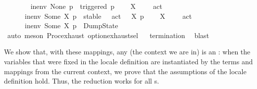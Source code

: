 \begin{isabellebody}
\ \ \ \isanewline
\ \ \ \ {\isacartoucheopen}in{\isacharunderscore}{\kern0pt}env\ None\ p\ {\isacharequal}{\kern0pt}\ triggered\ p{\isacartoucheclose}\isanewline
\ \ {\isacharbar}{\kern0pt}\ {\isacartoucheopen}{\isasymforall}\ {\isasymalpha}{\isasymin}X{\isachardot}{\kern0pt}\ {\isacharparenleft}{\kern0pt}{\isasymexists}\ {\isasymalpha}{\isacharprime}{\kern0pt}{\isachardot}{\kern0pt}\ {\isasymalpha}\ {\isacharequal}{\kern0pt}\ act\ {\isasymalpha}{\isacharprime}{\kern0pt}{\isacharparenright}{\kern0pt}\ {\isasymLongrightarrow}\ \isanewline
\ \ \ \ \ \ in{\isacharunderscore}{\kern0pt}env\ {\isacharparenleft}{\kern0pt}Some\ X{\isacharparenright}{\kern0pt}\ p\ {\isacharequal}{\kern0pt}\ stable\ {\isacharbraceleft}{\kern0pt}{\isasymalpha}{\isacharprime}{\kern0pt}\ {\isachardot}{\kern0pt}\ act\ {\isasymalpha}{\isacharprime}{\kern0pt}\ {\isasymin}\ X{\isacharbraceright}{\kern0pt}\ p{\isacartoucheclose}\isanewline
\ \ {\isacharbar}{\kern0pt}\ {\isacartoucheopen}{\isasymexists}\ {\isasymalpha}{\isasymin}X{\isachardot}{\kern0pt}\ {\isacharparenleft}{\kern0pt}{\isasymnexists}\ {\isasymalpha}{\isacharprime}{\kern0pt}{\isachardot}{\kern0pt}\ {\isasymalpha}\ {\isacharequal}{\kern0pt}\ act\ {\isasymalpha}{\isacharprime}{\kern0pt}{\isacharparenright}{\kern0pt}\ {\isasymLongrightarrow}\ \isanewline
\ \ \ \ \ \ in{\isacharunderscore}{\kern0pt}env\ {\isacharparenleft}{\kern0pt}Some\ X{\isacharparenright}{\kern0pt}\ p\ {\isacharequal}{\kern0pt}\ DumpState{\isacartoucheclose}\isanewline
%
\isadelimproof
\ \ %
\endisadelimproof
%
\isatagproof
{}\isamarkupfalse%
\ {\isacharparenleft}{\kern0pt}auto{\isacharcomma}{\kern0pt}\ meson\ Proc{\isacharunderscore}{\kern0pt}{\isasymtheta}{\isachardot}{\kern0pt}exhaust\ option{\isachardot}{\kern0pt}exhaust{\isacharunderscore}{\kern0pt}sel{\isacharparenright}{\kern0pt}%
\endisatagproof
{\isafoldproof}%
%
\isadelimproof
\isanewline
%
\endisadelimproof
{}\isamarkupfalse%
%
\isadelimproof
\ %
\endisadelimproof
%
\isatagproof
{}\isamarkupfalse%
\ {\isachardoublequoteopen}termination{\isachardoublequoteclose}\ \isamarkupfalse%
\ blast%
\endisatagproof
{\isafoldproof}%
%
\isadelimproof
%
\endisadelimproof
%
\begin{isamarkuptext}%
We show that, with these mappings, any  (the context we are in) is an : when the variables that were fixed in the locale definition are instantiated by the terms and mappings from the current context, we prove that the assumptions of the locale definition hold. Thus, the reduction works for all \LTSt{}s.%

\end{isamarkuptext}
\end{isabellebody}
